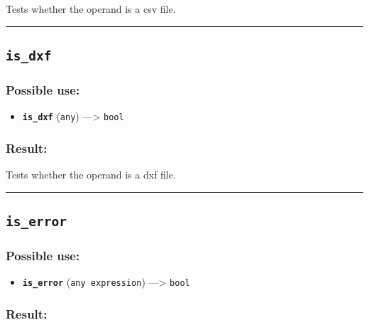 \documentclass[]{book}
\providecommand{\tightlist}{%
  \setlength{\itemsep}{0pt}\setlength{\parskip}{0pt}}
\theoremstyle{definition}
\theoremstyle{definition}
\theoremstyle{definition}
\theoremstyle{remark}
\begin{document}
Tests whether the operand is a csv file.

\begin{center}\rule{0.5\linewidth}{\linethickness}\end{center}

\subsection{\texorpdfstring{\texttt{is\_dxf}}{is\_dxf}}\label{is_dxf}

\subsubsection{Possible use:}\label{possible-use-286}

\begin{itemize}
\tightlist
\item
  \textbf{\texttt{is\_dxf}} (\texttt{any}) ---\textgreater{}
  \texttt{bool}
\end{itemize}

\subsubsection{Result:}\label{result-276}

Tests whether the operand is a dxf file.

\begin{center}\rule{0.5\linewidth}{\linethickness}\end{center}

\subsection{\texorpdfstring{\texttt{is\_error}}{is\_error}}\label{is_error}

\subsubsection{Possible use:}\label{possible-use-287}

\begin{itemize}
\tightlist
\item
  \textbf{\texttt{is\_error}} (\texttt{any\ expression})
  ---\textgreater{} \texttt{bool}
\end{itemize}

\subsubsection{Result:}\label{result-277}
\end{document}
